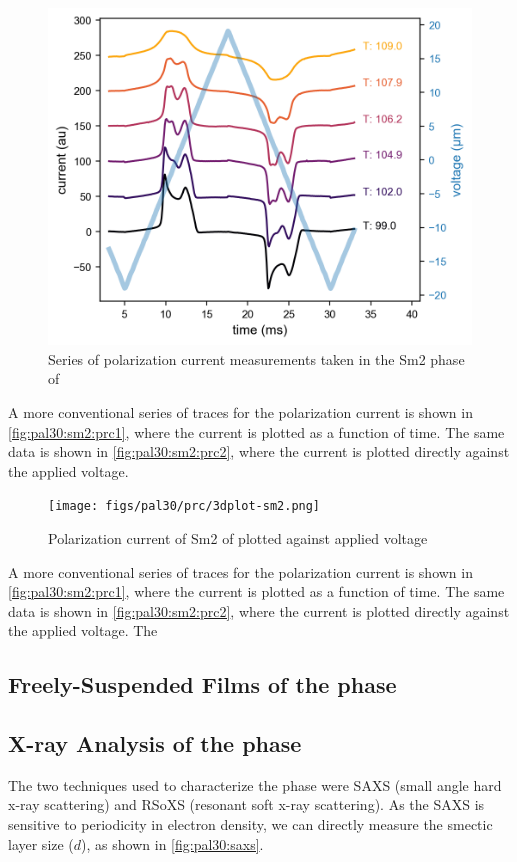 \documentclass[aagreenthesis]{subfiles}
\begin{document}
\begin{figure}[h!]
    \centering
    \includegraphics[width=.6\textwidth]{figs/pal30/prc/spacedSm2PRC.png}
    \caption{\label{fig:pal30:sm2:prc1} Series of polarization current
        measurements taken in the Sm2 phase of \nfour{}}
    \end{figure}

A more conventional series of traces for the polarization current is shown in
\autoref{fig:pal30:sm2:prc1}, where the current is plotted as a function of
time. The same data is shown in \autoref{fig:pal30:sm2:prc2}, where the
current is plotted directly against the applied voltage.

\begin{figure}[h!]
    \centering
    \texttt{[image: figs/pal30/prc/3dplot-sm2.png]}
    \caption{\label{fig:pal30:sm2:prc2} Polarization current of Sm2 of \nfour{}
    plotted against applied voltage}
\end{figure}
A more conventional series of traces for the polarization current is shown in
\autoref{fig:pal30:sm2:prc1}, where the current is plotted as a function of
time. The same data is shown in \autoref{fig:pal30:sm2:prc2}, where the
current is plotted directly against the applied voltage. The



\subsection{Freely-Suspended Films of the \smcpalpha{} phase}
\subsection{X-ray Analysis of the \smcpalpha{} phase}

The two techniques used to characterize the \smcpalpha phase were SAXS (small
angle hard x-ray scattering) and RSoXS (resonant soft x-ray scattering). As the
SAXS is sensitive to periodicity in electron density, we can directly measure
the smectic layer size ($d$), as shown in \autoref{fig:pal30:saxs}. 
\end{document}
